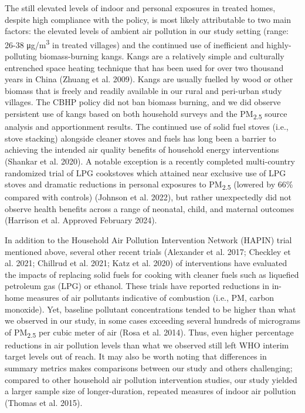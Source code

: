 \documentclass[
  letterpaper,
  DIV=11,
  numbers=noendperiod]{scrartcl}
\begin{document}
The still elevated levels of indoor and personal exposures in treated
homes, despite high compliance with the policy, is most likely
attributable to two main factors: the elevated levels of ambient air
pollution in our study setting (range: 26-38 μg/m\textsuperscript{3} in
treated villages) and the continued use of inefficient and
highly-polluting biomass-burning kangs. Kangs are a relatively simple
and culturally entrenched space heating technique that has been used for
over two thousand years in China (Zhuang et al. 2009). Kangs are usually
fuelled by wood or other biomass that is freely and readily available in
our rural and peri-urban study villages. The CBHP policy did not ban
biomass burning, and we did observe persistent use of kangs based on
both household surveys and the PM\textsubscript{2.5} source analysis and
apportionment results. The continued use of solid fuel stoves (i.e.,
stove stacking) alongside cleaner stoves and fuels has long been a
barrier to achieving the intended air quality benefits of household
energy interventions (Shankar et al. 2020). A notable exception is a
recently completed multi-country randomized trial of LPG cookstoves
which attained near exclusive use of LPG stoves and dramatic reductions
in personal exposures to PM\textsubscript{2.5} (lowered by 66\% compared
with controls) (Johnson et al. 2022), but rather unexpectedly did not
observe health benefits across a range of neonatal, child, and maternal
outcomes (Harrison et al. Approved February 2024).

In addition to the Household Air Pollution Intervention Network (HAPIN)
trial mentioned above, several other recent trials (Alexander et al.
2017; Checkley et al. 2021; Chillrud et al. 2021; Katz et al. 2020) of
interventions have evaluated the impacts of replacing solid fuels for
cooking with cleaner fuels such as liquefied petroleum gas (LPG) or
ethanol. These trials have reported reductions in in-home measures of
air pollutants indicative of combustion (i.e., PM, carbon monoxide).
Yet, baseline pollutant concentrations tended to be higher than what we
observed in our study, in some cases exceeding several hundreds of
micrograms of PM\textsubscript{2.5} per cubic meter of air (Rosa et al.
2014). Thus, even higher percentage reductions in air pollution levels
than what we observed still left WHO interim target levels out of reach.
It may also be worth noting that differences in summary metrics makes
comparisons between our study and others challenging; compared to other
household air pollution intervention studies, our study yielded a larger
sample size of longer-duration, repeated measures of indoor air
pollution (Thomas et al. 2015).
\end{document}
